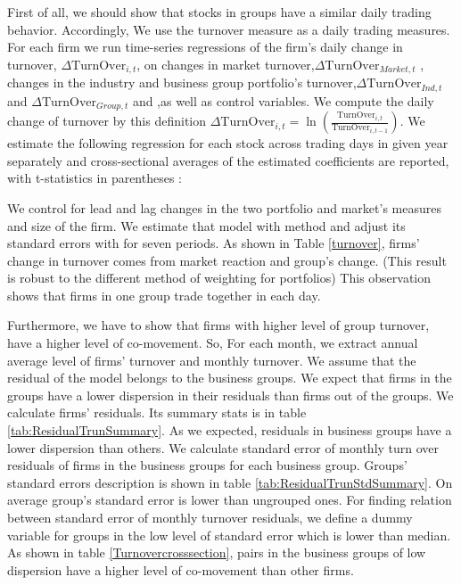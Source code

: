 \begin{LTR}
	First of all, we should show that stocks in groups have a similar daily trading behavior. Accordingly, We use the turnover measure as a daily trading measures. For each firm we run time-series regressions of the firm's daily change in turnover, $ \Delta \text{TurnOver}_{i,t} $, on changes in market turnover,$ \Delta\text{TurnOver}_{Market,t}   $ , changes in the industry and business group portfolio's turnover,$ \Delta\text{TurnOver}_{Ind,t} $ and  $\Delta \text{TurnOver}_{Group,t} $ and  ,as well as control variables.
We compute the daily change of turnover by this definition $ \Delta \text{TurnOver}_{i,t} = \ln(\frac{\text{TurnOver}_{i,t}}{\text{TurnOver}_{i,t-1}}) $. 
We estimate the following regression for each stock across trading days in given year separately and cross-sectional averages of the estimated coefficients are reported, with t-statistics in parentheses :

	
 We control for lead and lag changes in the two portfolio and market's measures and size of the firm. We estimate that model with \cite{FamaMacBeth} method and adjust its standard errors with \cite{newey1987hypothesis} for seven periods.  As shown in Table \ref{turnover}, firms' change in turnover comes from market reaction and group's change. (This result is robust to the different method of weighting for portfolios) This observation shows that firms in one group trade together in each day. 

Furthermore, we have to show that firms with higher level of group turnover, have a higher level of co-movement. So, For each month, we extract annual average level of firms' turnover and monthly turnover. We assume that the residual of the model belongs to the business groups. We expect that firms in the groups have a lower dispersion in their residuals than firms out of the groups. We calculate firms' residuals. Its summary stats is in table \ref{tab:ResidualTrunSummary}. As we expected, residuals in business groups have a lower dispersion than others.
We calculate standard error of monthly turn over residuals of firms in the business groups for each business group. Groups' standard errors description is shown in table \ref{tab:ResidualTrunStdSummary}. On average group's standard error is lower than ungrouped  ones. For finding relation between standard error of monthly turnover residuals, we define a dummy variable for groups in the low level of standard error which is lower than median. As shown in table \ref{Turnovercrosssection}, pairs in the business groups of low dispersion have a higher level of co-movement than other firms.  



\end{LTR}
